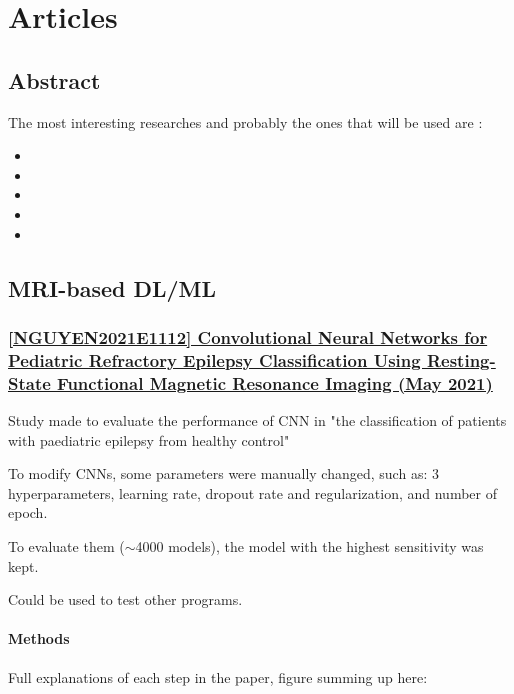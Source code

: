 \chapter{Articles}

\section{Abstract}

The most interesting researches and probably the ones that will be used are :
\begin{itemize}
	\item {}
	\item {}
	\item {}
	\item {}
	\item {}
\end{itemize}

\section{MRI-based DL/ML}

\newpage
\subsection{\href{https://www.sciencedirect.com/science/article/pii/S187887502032698X}{[NGUYEN2021E1112] Convolutional Neural Networks for Pediatric Refractory Epilepsy Classification Using Resting-State Functional Magnetic Resonance Imaging (May 2021) }}
\label{res1}


Study made to evaluate the performance of CNN in "the classification of patients with paediatric epilepsy from healthy control"

To modify CNNs, some parameters were manually changed, such as: 3 hyperparameters, learning rate, dropout rate and regularization, and number of epoch.

To evaluate them ($\sim$4000 models), the model with the highest sensitivity was kept.

Could be used to test other programs.

\subsubsection{Methods}

Full explanations of each step in the paper, figure summing up here: 

